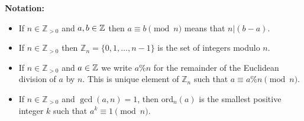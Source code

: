 \documentclass[12pt]{exam}
\begin{document}
\vspace{2cm}


\textbf{Notation:}
\begin{itemize}
    \item If $n \in \mathbb{Z}_{>0}$ and $a,b \in \mathbb{Z}$ then $a \equiv b \pmod{n}$ means that $n | (b-a)$.
	\item If $n \in \mathbb{Z}_{>0}$ then $\mathbb{Z}_n = \{0,1,\ldots, n-1\}$ is the set of integers modulo $n$. 
    \item If $n \in \mathbb{Z}_{>0}$ and $a\in \mathbb{Z}$ we write $a\%n$ for the remainder of the Euclidean division of $a$ by $n$. This is unique element of $\mathbb{Z}_n$ such that $a \equiv a\% n \pmod{n}$. 
    \item If $n \in \mathbb{Z}_{>0}$ and $\gcd(a,n) = 1$, then $\text{ord}_n(a)$ is the smallest positive integer $k$ such that $a^k \equiv 1 \pmod{n}$.
\end{itemize}
\end{document}
